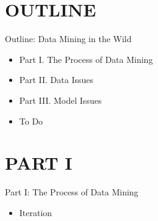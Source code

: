\documentclass[handout]{beamer}
\begin{document}
\section*{OUTLINE}
\begin{frame}{Outline: Data Mining in the Wild}
\begin{itemize}
\item[] Part I. The Process of Data Mining
\item[] Part II. Data Issues
\item[] Part III. Model Issues
\vspace*{0.3cm}
\item To Do
\end{itemize}
\end{frame}



\section{PART I}
\begin{frame}{Part I: The Process of Data Mining}
\begin{itemize}
\item Iteration
\end{itemize}
\end{frame}
\end{document}
